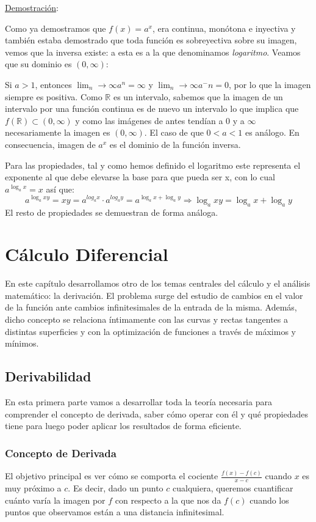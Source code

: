 \documentclass[10pt,a4paper,openright]{book}
\theoremstyle{break}
\begin{document}
\underline{Demostración}:\par
Como ya demostramos que $f(x)=a^x$, era continua, monótona e inyectiva y también estaba demostrado que toda función es sobreyectiva sobre su imagen, vemos que la inversa existe: a esta es a la que denominamos \textit{logaritmo}. Veamos que su dominio es $(0,\infty)$:\par
Si $a>1$, entonces $\lim_n\rightarrow \infty a^n = \infty$ y $\lim_n\rightarrow \infty a^-n = 0$, por lo que la imagen siempre es positiva. Como $\mathbb R$ es un intervalo, sabemos que la imagen de un intervalo por una función continua es de nuevo un intervalo lo que implica que $f(\mathbb R)\subset (0,\infty)$ y como las imágenes de antes tendían a 0 y a $\infty$ necesariamente la imagen es $(0,\infty)$. El caso de que $0<a<1$ es análogo. En consecuencia, imagen de $a^x$ es el dominio de la función inversa.

Para las propiedades, tal y como hemos definido el logaritmo este representa el exponente al que debe elevarse la base para que pueda ser x, con lo cual $a^{\log_a x} = x$ así que:
$$a^{\log_a xy}= xy=a^{log_a x}\cdot a^{log_a y}=a^{\log_a x + \log_a y}\Rightarrow \log_a xy = \log_a x +\log_a y$$
El resto de propiedades se demuestran de forma análoga.


\chapter{Cálculo Diferencial}
En este capítulo desarrollamos otro de los temas centrales del cálculo y el análisis matemático: la derivación. El problema surge del estudio de cambios en el valor de la función ante cambios infinitesimales de la entrada de la misma. Además, dicho concepto se relaciona íntimamente con las curvas y rectas tangentes a distintas superficies y con la optimización de funciones a través de máximos y mínimos.

\section{Derivabilidad}
En esta primera parte vamos a desarrollar toda la teoría necesaria para comprender el concepto de derivada, saber cómo operar con él y qué propiedades tiene para luego poder aplicar los resultados de forma eficiente.

\subsection{Concepto de Derivada}
El objetivo principal es ver cómo se comporta el cociente $\frac{f(x) - f(c)}{x-c}$ cuando $x$ es muy próximo a $c$. Es decir, dado un punto $c$ cualquiera, queremos cuantificar cuánto varía la imagen por $f$ con respecto a la que nos da $f(c)$ cuando los puntos que observamos están a una distancia infinitesimal.
\end{document}
